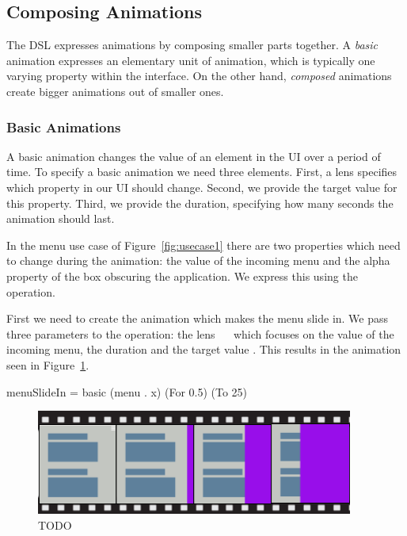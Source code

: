 \subsection{Composing Animations}

The DSL expresses animations by composing smaller parts together. A \emph{basic} animation expresses an elementary unit of animation, which is typically one varying property within the interface. On the other hand, \emph{composed} animations create bigger animations out of smaller ones.

\subsubsection{Basic Animations}

A basic animation changes the value of an element in the UI over a period of time. To specify a basic animation we need three elements. First, a lens specifies which property in our UI should change. Second, we provide the target value for this property. Third, we provide the duration, specifying how many seconds the animation should last.

In the menu use case of Figure~\ref{fig:usecase1} there are two properties which need to change during the animation: the  value of the incoming menu and the alpha property of the box obscuring the application. We express this using the  operation.

First we need to create the animation which makes the menu slide in. We pass three parameters to the  operation: the lens ~~ which focuses on the  value of the incoming menu, the duration  and the target value . This results in the animation seen in Figure~\ref{fig:usecase1basic1}.

\begin{code}
menuSlideIn = basic (menu . x) (For 0.5) (To 25)
\end{code}

\begin{figure}[H]
\centering
\includegraphics[scale=0.4]{pictures/usecase1basic1.png}
\caption{TODO}
\label{fig:usecase1basic1}
\end{figure}

